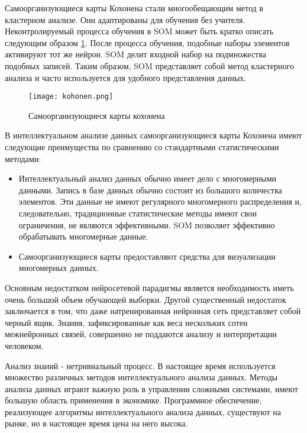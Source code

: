 Самоорганизующиеся карты Кохонена стали многообещающим метод в кластерном анализе. Они адаптированы для обучения без учителя. Неконтролируемый процесса обучения в SOM может быть кратко описать следующим образом \ref{pict:kohonen}.
После процесса обучения, подобные наборы элементов активируют тот же нейрон. SOM делит входной набор на подмножества подобных записей. Таким образом, SOM представляет собой метод кластерного анализа и часто используется для удобного представления данных.

\begin{figure}[h!]
\center
	\texttt{[image: kohonen.png]}
	\caption{Самоорганизующиеся карты кохонена}
	\label{pict:kohonen}
\end{figure}

В интеллектуальном анализе данных самоорганизующиеся карты Кохонена имеют следующие преимущества по сравнению со стандартными статистическими методами:

\begin{itemize}
\item Интеллектуальный анализ данных обычно имеет дело с многомерными данными. Запись в базе данных обычно состоит из большого количества элементов. Эти данные не имеют регулярного многомерного распределения и, следовательно, традиционные статистические методы имеют свои ограничения, не являются эффективными. SOM позволяет эффективно обрабатывать многомерные данные.
\item Самоорганизующиеся карты предоставляют средства для визуализации многомерных данных.
\end{itemize}

Основным недостатком нейросетевой парадигмы является необходимость иметь очень большой объем обучающей выборки. Другой существенный недостаток заключается в том, что даже натренированная нейронная сеть представляет собой черный ящик. Знания, зафиксированные как веса нескольких сотен межнейронных связей, совершенно не поддаются анализу и интерпретации человеком.

Анализ знаний - нетривиальный процесс. В настоящее время используется множество различных методов интеллектуального анализа данных. Методы анализа данных играют важную роль в управлении сложными системами, имеют большую область применения в экономике. Программное обеспечение, реализующее алгоритмы интеллектуального анализа данных, существуют на рынке, но в настоящее время цена на него высока. 

